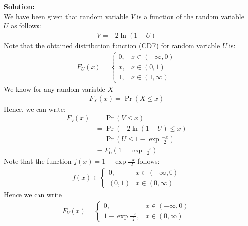 \documentclass[journal,12pt,twocolumn]{IEEEtran}
\begin{document}
\begin{enumerate}[label=\thesection.\arabic*
,ref=\thesection.\theenumi]
\noindent \textbf{Solution:}\\We have been given that random variable $V$ is a function of the random variable $U$ as follows:
\begin{align}
    V = -2\ln{(1 - U)}
\end{align}
	Note that the obtained distribution function (CDF) for random variable $U$ is:
\begin{align}
    	F_U(x) =
	\begin{cases}
		0, & x \in (-\infty, 0) \\
		x, & x \in (0, 1) \\
		1, & x \in (1, \infty)
	\end{cases}
\end{align}
We know for any random variable $X$
\begin{align}
    F_X(x) = \Pr(X \leq x)
\end{align}
	Hence, we can write:
\begin{align}
	F_V(x) &= \Pr(V \leq x) \\
	&= \Pr(-2\ln{(1 - U)} \leq x)\\
	&= \Pr(U \leq 1 - \exp{\frac{-x}{2}})\\
	&= F_U(1 - \exp{\frac{-x}{2}})
\end{align}
Note that the function $f(x) = 1 - \exp{\frac{-x}{2}}$ follows:
\begin{align}
    f(x) \in
	\begin{cases}
	    {0}, & x \in (-\infty, 0) \\
	    (0, 1) & x \in (0, \infty)
	\end{cases}
\end{align}
Hence we can write
\begin{align}
	F_V(x) =
	\begin{cases}
	    0, & x \in (-\infty, 0) \\
	    1 - \exp{\frac{-x}{2}}, & x \in (0, \infty)
    	\end{cases}
\end{align}

\end{enumerate}
\end{document}

